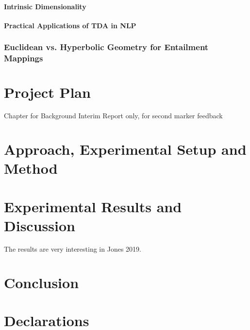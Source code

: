 \documentclass[12pt,twoside]{report}
\begin{document}
\subsubsection{Intrinsic Dimensionality}
\subsubsection{Practical Applications of TDA in NLP}
\subsection{Euclidean vs. Hyperbolic Geometry for Entailment Mappings}



\chapter{Project Plan}
Chapter for Background Interim Report only, for second marker feedback




\chapter{Approach, 
Experimental Setup and Method}


\chapter{Experimental Results and Discussion}
The results are very interesting in Jones 2019.

\chapter{Conclusion}





\chapter*{Declarations}
\end{document}
